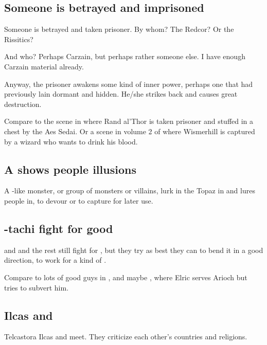 \subsection{Someone is betrayed and imprisoned}
Someone is betrayed and taken prisoner. By whom? The Redcor? Or the Rissitics?

And who? Perhaps Carzain, but perhaps rather someone else. I have enough Carzain material already. 

Anyway, the prisoner awakens some kind of inner power, perhaps one that had previously lain dormant and hidden. He/she strikes back and causes great destruction. 

Compare to the scene in  where Rand al'Thor is taken prisoner and stuffed in a chest by the Aes Sedai. Or a scene in volume 2 of \FLuneNoire{} where Wismerhill is captured by a wizard who wants to drink his blood. 







\subsection{A \succubus{} shows people illusions}
\index{\succubus}%
A -like monster, or group of monsters or villains, lurk in the Topaz \Chateau{} in \Redce{} and lures people in, to devour or to capture for later use.







\subsection{\Dzasselid-tachi fight for good}
\Dzasselid{} and \Narkiza{} and the rest still fight for \Nechsain, but they try as best they can to bend it in a good direction, to work for a kind of .

Compare to lots of good guys in \cite{StevenEriksonIanCameronEsslemont:MalazanBookoftheFallen}, and maybe , where Elric serves Arioch but tries to subvert him. 







\subsection{Ilcas and \Narkiza}
Telcastora Ilcas and \Narkiza{} meet. 
They criticize each other's countries and religions. 

